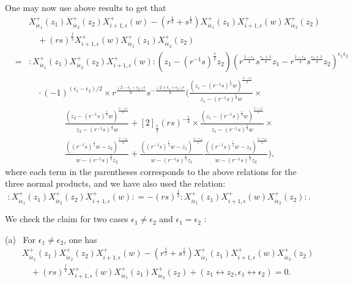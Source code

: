 \documentclass{amsproc}
\theoremstyle{remark}
\numberwithin{equation}{section}
\begin{document}
One may now use above results to get that
\begin{eqnarray*}
&&X_{i{\epsilon}_1}^+(z_1)X_{i{\epsilon}_2}^+(z_2)X^+_{i+1,{\epsilon}}(w)-(r^{\frac{1}{2}}+s^{\frac{1}{2}})
X_{i{\epsilon}_1}^+(z_1)X^+_{i+1,{\epsilon}}(w)X_{i{\epsilon}_2}^+(z_2)\\
&&\quad +(rs)^{\frac{1}{2}}X^+_{i+1,{\epsilon}}(w)X_{i{\epsilon}_1}^+(z_1)X_{i{\epsilon}_2}^+(z_2) \\
&=&:X_{i{\epsilon}_1}^+(z_1)X_{i{\epsilon}_2}^+(z_2)X^+_{i+1,{\epsilon}}(w):
(z_1-(r^{-1}s)^{\frac{1}{2}}z_2)
(r^{\frac{1-{\epsilon}_1}{4}}s^{\frac{{\epsilon}_1+1}{4}}z_1-
r^{\frac{1-{\epsilon}_2}{4}}s^{\frac{{\epsilon}_2+1}{4}}z_2)^{{\epsilon}_1{\epsilon}_2}\\
&& \quad \cdot (-1)^{({\epsilon}_1-{\epsilon}_2)/2}\times r^{\frac{(2-{\epsilon}_1-{\epsilon}_2){\epsilon}}{8}}s^{-\frac{(2+{\epsilon}_1+{\epsilon}_2){\epsilon}}{8}}
\Big( \frac{(z_1-(r^{-1}s)^{\frac{\epsilon}{4}}w)^{\frac{|{\epsilon}-{\epsilon}_1|}2}}{z_1-(r^{-1}s)^{\frac{1}{4}}w}\times
 \end{eqnarray*}
\begin{eqnarray} \label{g:1}
&&\quad\frac{(z_2-(r^{-1}s)^{\frac{\epsilon}{4}}w)^{\frac{|{\epsilon}-{\epsilon}_2|}2}}{z_2-(r^{-1}s)^{\frac{1}{4}}w}
 +[2]_{\frac{1}{2}}(rs)^{-\frac{1}{4}}\times
\frac{(z_1-(r^{-1}s)^{\frac{\epsilon}{4}}w)^{\frac{|{\epsilon}-{\epsilon}_1|}2}}{z_1-(r^{-1}s)^{\frac{1}{4}}w}\times \\
&&\quad\frac{((r^{-1}s)^{\frac{\epsilon}{4}}w-z_2)^{\frac{|{\epsilon}-{\epsilon}_2|}2}}{w-(r^{-1}s)^{\frac{1}{4}}z_2}+
\frac{((r^{-1}s)^{\frac{\epsilon}{4}}w-z_1)^{\frac{|{\epsilon}-{\epsilon}_1|}2}}{w-(r^{-1}s)^{\frac{1}{4}}z_1}
\frac{((r^{-1}s)^{\frac{\epsilon}{4}}w-z_2)^{\frac{|{\epsilon}-{\epsilon}_2|}2}}{w-(r^{-1}s)^{\frac{1}{4}}z_2}\Big),\nonumber
  \end{eqnarray}
where each term in the parentheses corresponds to the above relations for the
three normal products, and we have also used the relation:
$$:X_{i{\epsilon}_1}^+(z_1)X_{i{\epsilon}_2}^+(z_2)X^+_{i+1,{\epsilon}}(w):
=-(rs)^{\frac{1}{2}}:X_{i{\epsilon}_1}^+(z_1)X^+_{i+1,{\epsilon}}(w)X_{i{\epsilon}_2}^+(z_2):.$$

We check the claim for two cases ${\epsilon}_1\neq {\epsilon}_2$ and ${\epsilon}_1={\epsilon}_2$ :

(a) \ For ${\epsilon}_1\neq {\epsilon}_2$, one has
\begin{eqnarray}\label{E:S2}
&&X_{i{\epsilon}_1}^+(z_1)X_{i{\epsilon}_2}^+(z_2)X^+_{i+1,{\epsilon}}(w)-(r^{\frac{1}{2}}+s^{\frac{1}{2}})
X_{i{\epsilon}_1}^+(z_1)X^+_{i+1,{\epsilon}}(w)X_{i{\epsilon}_2}^+(z_2)\nonumber\\
&&\quad
+(rs)^{\frac{1}{2}}X^+_{i+1,{\epsilon}}(w)X_{i{\epsilon}_1}^+(z_1)X_{i{\epsilon}_2}^+(z_2)
+(z_1\leftrightarrow z_2, {\epsilon}_1\leftrightarrow {\epsilon}_2)=0.
\end{eqnarray}
\end{document}
